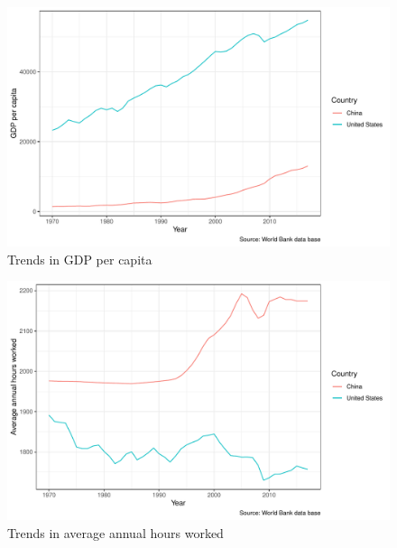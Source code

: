 \documentclass[11pt,a4paper,]{article}
\begin{document}
\begin{figure}
\centering
\includegraphics{report_files/figure-latex/Figure1-1.pdf}
\caption{\label{fig:Figure1}Trends in GDP per capita}
\end{figure}

\begin{Shaded}
\begin{Highlighting}[]
 \NormalTok{(}
                           \SpecialCharTok{+}
  \NormalTok{() }\SpecialCharTok{+}
  \NormalTok{(}\NormalTok{, }
        \NormalTok{)}\SpecialCharTok{+}
    \NormalTok{()}
\end{Highlighting}
\end{Shaded}

\begin{figure}
\centering
\includegraphics{report_files/figure-latex/Figure2-1.pdf}
\caption{\label{fig:Figure2}Trends in average annual hours worked}
\end{figure}
\end{document}
